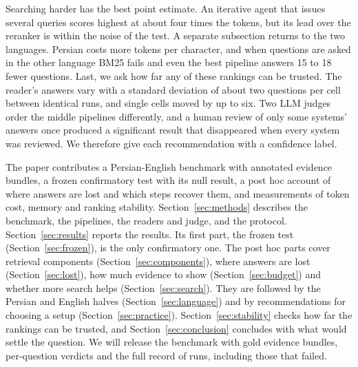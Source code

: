 Searching harder has the best point estimate. An iterative agent that issues several queries scores highest at about four times the tokens, but its lead over the reranker is within the noise of the test. A separate subsection returns to the two languages. Persian costs more tokens per character, and when questions are asked in the other language BM25 fails and even the best pipeline answers 15 to 18 fewer questions. Last, we ask how far any of these rankings can be trusted. The reader's answers vary with a standard deviation of about two questions per cell between identical runs, and single cells moved by up to six. Two LLM judges order the middle pipelines differently, and a human review of only some systems' answers once produced a significant result that disappeared when every system was reviewed. We therefore give each recommendation with a confidence label.

The paper contributes a Persian-English benchmark with annotated evidence bundles, a frozen confirmatory test with its null result, a post hoc account of where answers are lost and which steps recover them, and measurements of token cost, memory and ranking stability. Section~\ref{sec:methods} describes the benchmark, the pipelines, the readers and judge, and the protocol. Section~\ref{sec:results} reports the results. Its first part, the frozen test (Section~\ref{sec:frozen}), is the only confirmatory one. The post hoc parts cover retrieval components (Section~\ref{sec:components}), where answers are lost (Section~\ref{sec:lost}), how much evidence to show (Section~\ref{sec:budget}) and whether more search helps (Section~\ref{sec:search}). They are followed by the Persian and English halves (Section~\ref{sec:language}) and by recommendations for choosing a setup (Section~\ref{sec:practice}). Section~\ref{sec:stability} checks how far the rankings can be trusted, and Section~\ref{sec:conclusion} concludes with what would settle the question. We will release the benchmark with gold evidence bundles, per-question verdicts and the full record of runs, including those that failed.
